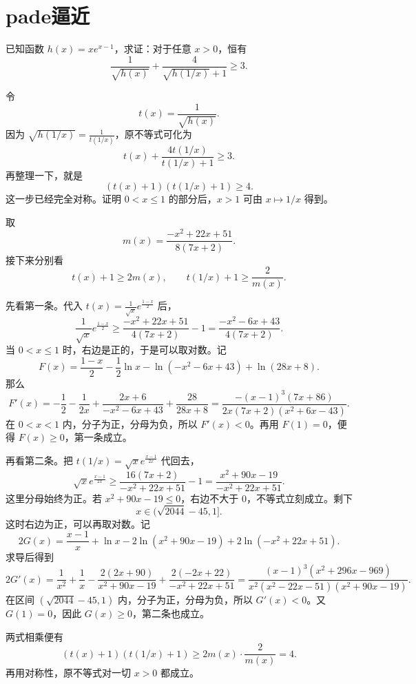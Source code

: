 \section{pade逼近}
\begin{example}
已知函数 $h(x) = x e^{x-1}$，求证：对于任意 $x>0$，恒有
\[
\frac{1}{\sqrt{h(x)}} + \frac{4}{\sqrt{h(1/x)}+1} \ge 3.
\]
\end{example}
\begin{solution}
令
\[
t(x)=\frac{1}{\sqrt{h(x)}}.
\]
因为 \(\sqrt{h(1/x)}=\frac1{t(1/x)}\)，原不等式可化为
\[
t(x)+\frac{4t(1/x)}{t(1/x)+1}\ge3.
\]
再整理一下，就是
\[
(t(x)+1)(t(1/x)+1)\ge4.
\]
这一步已经完全对称。证明 \(0<x\le1\) 的部分后，\(x>1\) 可由 \(x\mapsto1/x\) 得到。

取
\[
m(x)=\frac{-x^2+22x+51}{8(7x+2)}.
\]
接下来分别看
\[
t(x)+1\ge2m(x),\qquad t(1/x)+1\ge\frac{2}{m(x)}.
\]

先看第一条。代入 \(t(x)=\frac{1}{\sqrt{x}}e^{\frac{1-x}{2}}\) 后，
\[
\frac{1}{\sqrt{x}}e^{\frac{1-x}{2}} \ge \frac{-x^2+22x+51}{4(7x+2)} - 1 = \frac{-x^2-6x+43}{4(7x+2)}.
\]
当 \(0<x\le1\) 时，右边是正的，于是可以取对数。记
\[
F(x)=\frac{1-x}{2}-\frac12\ln x-\ln(-x^2-6x+43)+\ln(28x+8).
\]
那么
\[
F'(x)= -\frac{1}{2} - \frac{1}{2x} + \frac{2x+6}{-x^2-6x+43} + \frac{28}{28x+8}
= \frac{-(x-1)^3(7x+86)}{2x(7x+2)(x^2+6x-43)}.
\]
在 \(0<x<1\) 内，分子为正，分母为负，所以 \(F'(x)<0\)。再用 \(F(1)=0\)，便得 \(F(x)\ge0\)，第一条成立。

再看第二条。把 \(t(1/x)=\sqrt{x}e^{\frac{x-1}{2x}}\) 代回去，
\[
\sqrt{x}e^{\frac{x-1}{2x}} \ge \frac{16(7x+2)}{-x^2+22x+51} - 1 = \frac{x^2+90x-19}{-x^2+22x+51}.
\]
这里分母始终为正。若 \(x^2+90x-19\le0\)，右边不大于 \(0\)，不等式立刻成立。剩下
\[
x\in(\sqrt{2044}-45,1].
\]
这时右边为正，可以再取对数。记
\[
2G(x)=\frac{x-1}{x}+\ln x-2\ln(x^2+90x-19)+2\ln(-x^2+22x+51).
\]
求导后得到
\[
2G'(x)=\frac{1}{x^2} + \frac{1}{x} - \frac{2(2x+90)}{x^2+90x-19} + \frac{2(-2x+22)}{-x^2+22x+51}
= \frac{(x-1)^3(x^2+296x-969)}{x^2(x^2-22x-51)(x^2+90x-19)}.
\]
在区间 \((\sqrt{2044}-45,1)\) 内，分子为正，分母为负，所以 \(G'(x)<0\)。又 \(G(1)=0\)，因此 \(G(x)\ge0\)，第二条也成立。

两式相乘便有
\[
(t(x)+1)(t(1/x)+1)\ge 2m(x)\cdot\frac{2}{m(x)}=4.
\]
再用对称性，原不等式对一切 \(x>0\) 都成立。
\end{solution}
